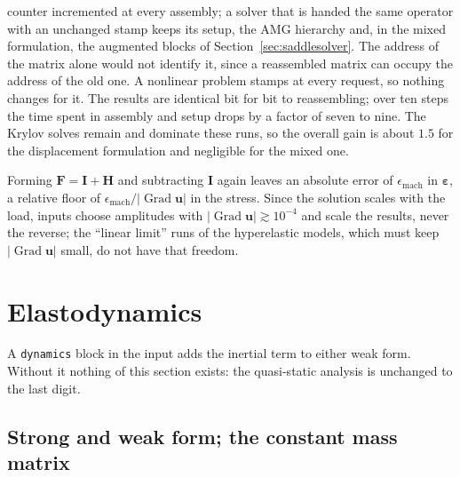 \documentclass[11pt]{article}
\newcommand{\Grad}{\operatorname{Grad}}
\newcommand{\bu}{\bm{u}}
\newcommand{\beps}{\bm{\varepsilon}}
\newcommand{\bF}{\bm{F}}
\newcommand{\bI}{\bm{I}}
\newcommand{\bH}{\bm{H}}
\DeclareRobustCommand{\code}[1]{{\def\_{\textunderscore\allowbreak}\texttt{#1}}}
\begin{document}
\begin{itemize}[nosep]
    counter incremented at every assembly; a solver that is handed the same
    operator with an unchanged stamp keeps its setup, the AMG hierarchy and,
    in the mixed formulation, the augmented blocks of
    Section~\ref{sec:saddlesolver}.  The address of the matrix alone would
    not identify it, since a reassembled matrix can occupy the address of the
    old one.  A nonlinear problem stamps at every request, so nothing changes
    for it.  The results are identical bit for bit to reassembling; over ten
    steps the time spent in assembly and setup drops by a factor of seven to
    nine.  The Krylov solves remain and dominate these runs, so the overall
    gain is about $1.5$ for the displacement formulation and negligible for
    the mixed one.
\end{itemize}
Forming $\bF = \bI + \bH$ and subtracting $\bI$ again leaves an absolute
error of $\epsilon_{\mathrm{mach}}$ in $\beps$, a relative floor of
$\epsilon_{\mathrm{mach}}/|\Grad\bu|$ in the stress.  Since the solution
scales with the load, inputs choose amplitudes with
$|\Grad\bu| \gtrsim 10^{-4}$ and scale the results, never the reverse; the
``linear limit'' runs of the hyperelastic models, which must keep
$|\Grad\bu|$ small, do not have that freedom.

\section{Elastodynamics}
\label{sec:dynamics}

A \code{dynamics} block in the input adds the inertial term to either weak
form.  Without it nothing of this section exists: the quasi-static analysis
is unchanged to the last digit.

\subsection{Strong and weak form; the constant mass matrix}
\end{document}
